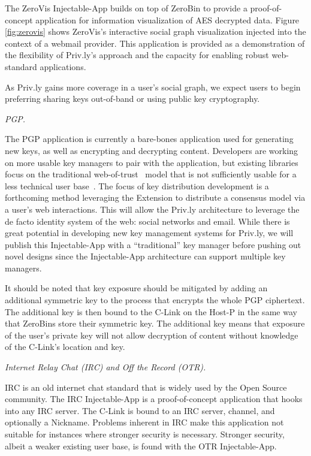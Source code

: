 \documentclass[letterpaper,twocolumn,10pt]{article}
\begin{document}
The ZeroVis Injectable-App builds on top of ZeroBin to provide a proof-of-concept application for information visualization of AES decrypted data. Figure \ref{fig:zerovis} shows ZeroVis's interactive social graph visualization injected into the context of a webmail provider. This application is provided as a demonstration of the flexibility of Priv.ly's approach and the capacity for enabling robust web-standard applications.

As Priv.ly gains more coverage in a user's social graph, we expect users to begin preferring sharing keys out-of-band or using public key cryptography.

\emph{PGP.}

The PGP application is currently a bare-bones application used for generating new keys, as well as encrypting and decrypting content. Developers are working on more usable key managers to pair with the application, but existing libraries focus on the traditional web-of-trust~\cite{garfinkel1994pgp} model that is not sufficiently usable for a less technical user base~\cite{Whitten1999,Fahl2012}. The focus of key distribution development is a forthcoming method leveraging the Extension to distribute a consensus model via a user's web interactions. This will allow the Priv.ly architecture to leverage the de facto identity system of the web: social networks and email. While there is great potential in developing new key management systems for Priv.ly, we will publish this Injectable-App with a ``traditional'' key manager before pushing out novel designs since the Injectable-App architecture can support multiple key managers.

It should be noted that key exposure should be mitigated by adding an additional symmetric key to the process that encrypts the whole PGP ciphertext. The additional key is then bound to the C-Link on the Host-P in the same way that ZeroBins store their symmetric key. The additional key means that exposure of the user's private key will not allow decryption of content without knowledge of the C-Link's location and key.

\emph{Internet Relay Chat (IRC) and Off the Record (OTR).}

IRC is an old internet chat standard that is widely used by the Open Source community. The IRC Injectable-App is a proof-of-concept application that hooks into any IRC
server. The C-Link is bound to an IRC server, channel, and optionally a Nickname. Problems inherent in IRC make this application not suitable for instances where
stronger security is necessary. Stronger security, albeit a weaker existing user base, is found with the OTR Injectable-App. 
\end{document}
